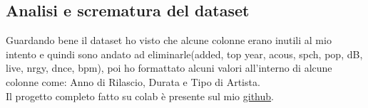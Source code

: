 \documentclass[acmsmall, 10pt]{acmart}
\begin{document}
\subsection{Analisi e scrematura del dataset}
Guardando bene il dataset ho visto che alcune colonne erano inutili al mio intento e quindi sono andato ad eliminarle(added, top year, acous, spch, pop, dB, live, nrgy, dnce, bpm), poi ho formattato alcuni valori all'interno di alcune colonne come: Anno di Rilascio, Durata e Tipo di Artista.
\\
Il progetto completo fatto su colab è presente sul mio \href{https://github.com/Kid-John/FiaProject.git}{github}.
\end{document}
